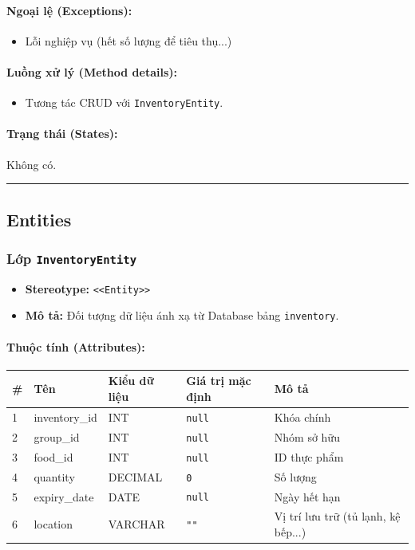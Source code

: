 \documentclass[12pt,a4paper]{article}
\begin{document}
\paragraph{Ngoại lệ (Exceptions):}
\begin{itemize}[leftmargin=*]
    \item Lỗi nghiệp vụ (hết số lượng để tiêu thụ...)
\end{itemize}


\paragraph{Luồng xử lý (Method details):}
\begin{itemize}[leftmargin=*]
    \item Tương tác CRUD với \texttt{InventoryEntity}.
\end{itemize}


\paragraph{Trạng thái (States):}
Không có.

\vskip 0.5cm
\noindent\rule{\textwidth}{0.5pt}
\vskip 0.5cm

\subsection{Entities}

\subsubsection{Lớp \texttt{InventoryEntity}}
\begin{itemize}[leftmargin=*]
    \item \textbf{Stereotype:} \texttt{\textless{}\textless{}Entity\textgreater{}\textgreater{}}
    \item \textbf{Mô tả:} Đối tượng dữ liệu ánh xạ từ Database bảng \texttt{inventory}.
\end{itemize}

\paragraph{Thuộc tính (Attributes):}
\begin{longtable}{|p{0.6cm}|p{2.8cm}|p{2.2cm}|p{1.8cm}|p{5.8cm}|}
\hline
\textbf{\#} & \textbf{Tên} & \textbf{Kiểu dữ liệu} & \textbf{Giá trị mặc định} & \textbf{Mô tả} \\ \hline
\endhead
1 & inventory\_id & INT & \texttt{null} & Khóa chính \\ \hline
2 & group\_id & INT & \texttt{null} & Nhóm sở hữu \\ \hline
3 & food\_id & INT & \texttt{null} & ID thực phẩm \\ \hline
4 & quantity & DECIMAL & \texttt{0} & Số lượng \\ \hline
5 & expiry\_date & DATE & \texttt{null} & Ngày hết hạn \\ \hline
6 & location & VARCHAR & \texttt{""} & Vị trí lưu trữ (tủ lạnh, kệ bếp...) \\ \hline
\end{longtable}
\end{document}
